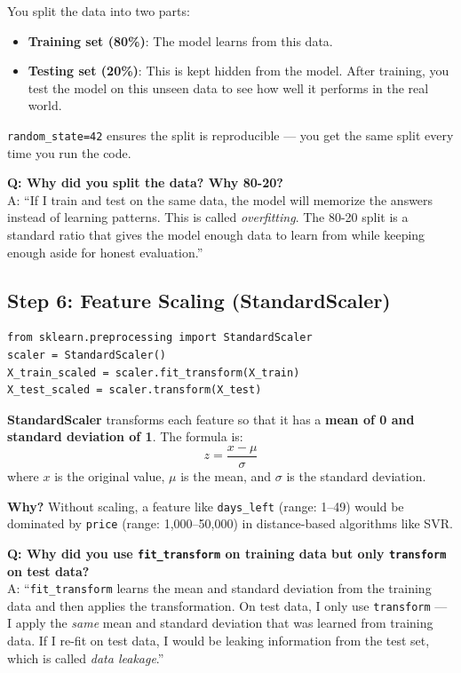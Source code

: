 \documentclass[12pt, a4paper]{article}
\begin{document}
\begin{conceptbox}
    You split the data into two parts:
    \begin{itemize}
        \item \textbf{Training set (80\%)}: The model learns from this data.
        \item \textbf{Testing set (20\%)}: This is kept hidden from the model. After training, you test the model on this unseen data to see how well it performs in the real world.
    \end{itemize}
    \texttt{random\_state=42} ensures the split is reproducible — you get the same split every time you run the code.
\end{conceptbox}

\begin{warnbox}
    \textbf{Q: Why did you split the data? Why 80-20?} \\
    A: ``If I train and test on the same data, the model will memorize the answers instead of learning patterns. This is called \textit{overfitting}. The 80-20 split is a standard ratio that gives the model enough data to learn from while keeping enough aside for honest evaluation.''
\end{warnbox}


\subsection{Step 6: Feature Scaling (StandardScaler)}

\begin{lstlisting}
from sklearn.preprocessing import StandardScaler
scaler = StandardScaler()
X_train_scaled = scaler.fit_transform(X_train)
X_test_scaled = scaler.transform(X_test)
\end{lstlisting}

\begin{conceptbox}
    \textbf{StandardScaler} transforms each feature so that it has a \textbf{mean of 0 and standard deviation of 1}. The formula is:
    \[
        z = \frac{x - \mu}{\sigma}
    \]
    where $x$ is the original value, $\mu$ is the mean, and $\sigma$ is the standard deviation.

    \vspace{0.3cm}
    \textbf{Why?} Without scaling, a feature like \texttt{days\_left} (range: 1--49) would be dominated by \texttt{price} (range: 1,000--50,000) in distance-based algorithms like SVR.
\end{conceptbox}

\begin{warnbox}
    \textbf{Q: Why did you use \texttt{fit\_transform} on training data but only \texttt{transform} on test data?} \\
    A: ``\texttt{fit\_transform} learns the mean and standard deviation from the training data and then applies the transformation. On test data, I only use \texttt{transform} — I apply the \textit{same} mean and standard deviation that was learned from training data. If I re-fit on test data, I would be leaking information from the test set, which is called \textit{data leakage}.''
\end{warnbox}
\end{document}
